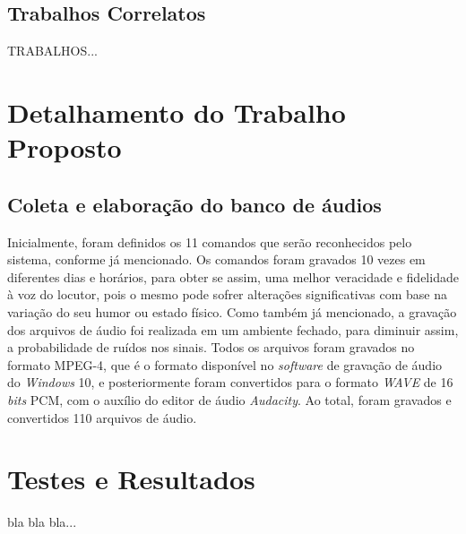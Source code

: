 \documentclass[a4paper,12pt,twoside,openright]{report}
\begin{document}
\section{Trabalhos Correlatos}
\label{trabalhos_correlatos}

\par TRABALHOS...

\chapter{Detalhamento do Trabalho Proposto}
\label{cap3}
\thispagestyle{myheadings}
\vspace*{-0.3cm}
\section{Coleta e elabora{\c c}\~{a}o do banco de \'{a}udios}
\par Inicialmente, foram definidos os 11 comandos que ser\~{a}o reconhecidos pelo sistema, conforme j\'{a} mencionado. Os comandos foram gravados 10 vezes em diferentes dias e hor\'{a}rios, para obter se assim, uma melhor veracidade e fidelidade \`{a} voz do locutor, pois o mesmo pode sofrer altera{\c c}\~{o}es significativas com base na varia{\c c}\~{a}o do seu humor ou estado f\'{i}sico. Como tamb\'{e}m j\'{a} mencionado, a grava{\c c}\~{a}o dos arquivos de \'{a}udio foi realizada em um ambiente fechado, para diminuir assim, a probabilidade de ru\'{i}dos nos sinais. Todos os arquivos foram gravados no formato MPEG-4, que \'{e} o formato dispon\'{i}vel no \textit{software} de grava{\c c}\~{a}o de \'{a}udio do \textit{Windows} 10, e posteriormente foram convertidos para o formato \textit{WAVE} de 16 \textit{bits} PCM, com o aux\'{i}lio do editor de \'{a}udio \textit{Audacity}. Ao total, foram gravados e convertidos 110 arquivos de \'{a}udio.
\chapter{Testes e Resultados}
\label{cap4}
\thispagestyle{myheadings}
bla bla bla...
\end{document}
